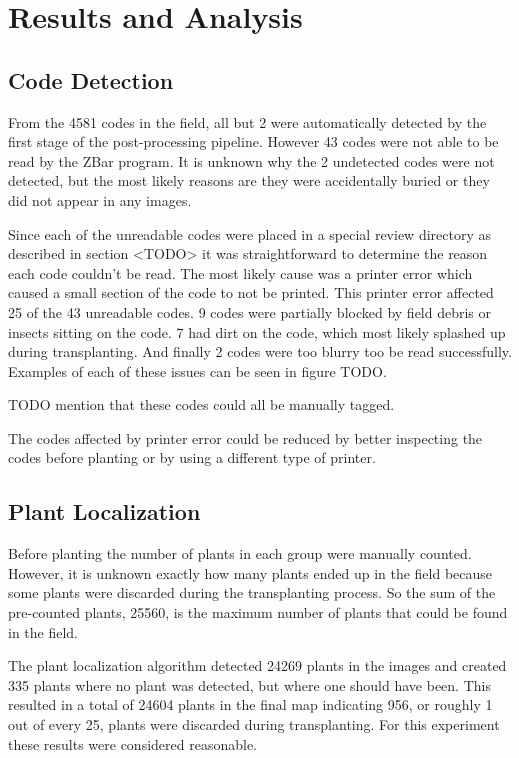 
\cleardoublepage

\chapter{Results and Analysis}
\label{processing}

\section{Code Detection}

From the 4581 codes in the field, all but 2 were automatically detected by the first stage of the post-processing pipeline.  However 43 codes were not able to be read by the ZBar program.  It is unknown why the 2 undetected codes were not detected, but the most likely reasons are they were accidentally buried or they did not appear in any images.  

Since each of the unreadable codes were placed in a special review directory as described in section <TODO> it was straightforward to determine the reason each code couldn't be read.  The most likely cause was a printer error which caused a small section of the code to not be printed.  This printer error affected 25 of the 43 unreadable codes.  9 codes were partially blocked by field debris or insects sitting on the code.  7 had dirt on the code, which most likely splashed up during transplanting. And finally 2 codes were too blurry too be read successfully.  Examples of each of these issues can be seen in figure TODO. 

TODO mention that these codes could all be manually tagged.

The codes affected by printer error could be reduced by better inspecting the codes before planting or by using a different type of printer.


\section{Plant Localization}

Before planting the number of plants in each group were manually counted. However, it is unknown exactly how many plants ended up in the field because some plants were discarded during the transplanting process.  So the sum of the pre-counted plants, 25560, is the maximum number of plants that could be found in the field.  

The plant localization algorithm detected 24269 plants in the images and created 335 plants where no plant was detected, but where one should have been.  This resulted in a total of 24604 plants in the final map indicating 956, or roughly 1 out of every 25, plants were discarded during transplanting.  For this experiment these results were considered reasonable. 

